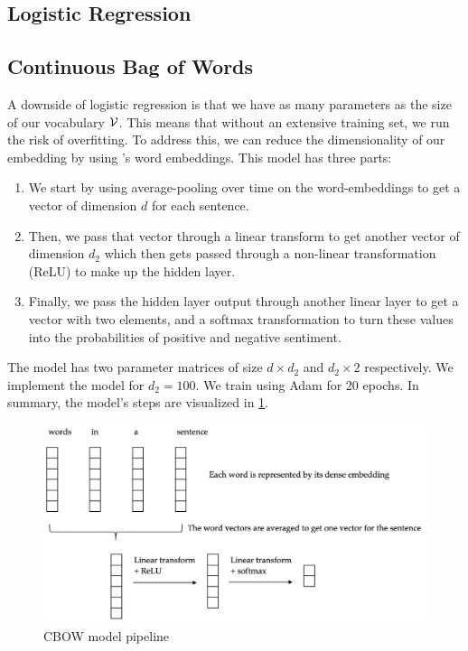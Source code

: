\documentclass[11pt]{article}
\begin{document}
\subsection{Logistic Regression}
\label{subsec:logistic}

\subsection{Continuous Bag of Words}
\label{subsec:cbow}

A downside of logistic regression is that we have as many parameters as the size
of our vocabulary $\mathcal{V}$. This means that without an extensive training set, we
run the risk of overfitting. To address this, we can reduce the dimensionality
of our embedding by using \citet{mikolov2013efficient}'s word embeddings. This model has three parts:

\begin{enumerate}
\item We start by using average-pooling over time on the word-embeddings to get
a vector of dimension $d$ for each sentence.
\item Then, we pass that vector through a linear transform to get another vector
of dimension $d_2$ which then gets passed through a non-linear transformation
(ReLU) to make up the hidden layer.
\item Finally, we pass the hidden layer output through another linear layer to
get a vector with two elements, and a softmax transformation to turn these
values into the probabilities of positive and negative sentiment.
\end{enumerate}

The model has two parameter matrices of size $d \times d_2$ and $d_2 \times 2$
respectively. We implement the model for $d_2=100$. We train using Adam for 20
epochs. In summary, the model's steps are visualized in \cref{fig:cbow}.

\begin{figure}[htb]
\centering
\includegraphics[width=\textwidth]{figs/cbow}
\caption{CBOW model pipeline}
\label{fig:cbow}
\end{figure}
\end{document}
